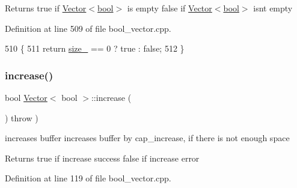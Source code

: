 \begin{DoxyReturn}{Returns}
true if \hyperlink{classVector_3_01bool_01_4}{Vector$<$bool$>$} is empty false if \hyperlink{classVector_3_01bool_01_4}{Vector$<$bool$>$} isn\textquotesingle{}t empty 
\end{DoxyReturn}


Definition at line 509 of file bool\+\_\+vector.\+cpp.


\begin{DoxyCode}
510     \{
511         \textcolor{keywordflow}{return} \hyperlink{classVector_3_01bool_01_4_a07895adb41b2c819f85640e35c0d4ae0}{size\_} == 0 ? true : \textcolor{keyword}{false};
512     \}
\end{DoxyCode}
\mbox{\label{classVector_3_01bool_01_4_afebfb559bb1f4b771fe43b5d2a94a3d7}} 
\subsubsection{\texorpdfstring{increase()}{increase()}}
{\footnotesize\ttfamily bool \hyperlink{classVector}{Vector}$<$ bool $>$\+::increase (\begin{DoxyParamCaption}{ }\end{DoxyParamCaption}) throw  ) \hspace{0.3cm}{\ttfamily [private]}}



increases buffer  increases buffer by cap\+\_\+increase, if there is not enough space 

\begin{DoxyReturn}{Returns}
true if increase success false if increase error 
\end{DoxyReturn}


Definition at line 119 of file bool\+\_\+vector.\+cpp.


